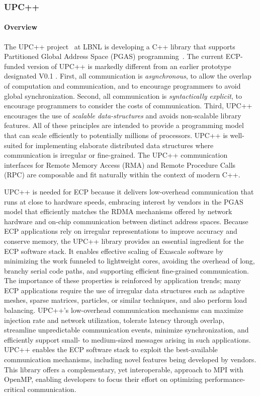 \subsubsection{ UPC++} 
\paragraph{Overview} 
The UPC++ project~\cite{upcxx-site} at LBNL is developing a C++ library
that supports Partitioned Global Address Space (PGAS) programming~\cite{Bachan:paw17,upcxx-spec}.
The current ECP-funded version of
UPC++ is markedly different from an earlier prototype designated V0.1 \cite{zheng:ipdps14}.  
First, all communication is \emph{asynchronous}, to allow the overlap of computation and
communication, and to encourage programmers to avoid global synchronization. Second, all communication
is \emph{syntactically explicit}, to encourage programmers to consider the costs of communication. Third,
UPC++ encourages the use of \emph{scalable data-structures}
and avoids non-scalable library features.
All of these principles are intended to provide a programming model that can
scale efficiently to potentially millions of processors.
UPC++ is well-suited for implementing elaborate distributed data structures where
communication is irregular or fine-grained. 
The UPC++ communication interfaces for Remote Memory Access (RMA) 
and Remote Procedure Calls (RPC)
are composable and fit naturally within the context of modern C++.

UPC++ is needed for ECP because it delivers low-overhead communication that runs
at close to hardware speeds, embracing 
interest by vendors in the PGAS model that
efficiently matches the RDMA mechanisms offered by
network hardware and on-chip communication between distinct address
spaces.  
Because ECP applications rely on irregular representations
to improve accuracy and conserve memory, the UPC++ library provides
an essential ingredient for the ECP software stack.  It enables
effective scaling of Exascale software by minimizing the work funneled
to lightweight cores, avoiding the overhead of long, branchy serial
code paths, and supporting efficient fine-grained communication.  The
importance of these properties is reinforced by application trends;
many ECP applications require the use of irregular data structures such as 
adaptive meshes, sparse
matrices, particles, or similar techniques, and also perform load balancing.  UPC++'s
low-overhead communication mechanisms can maximize injection rate and
network utilization, tolerate latency through overlap, streamline
unpredictable communication events, minimize synchronization, and
efficiently support small- to medium-sized messages arising in such
applications.  UPC++ enables the ECP software stack to exploit
the best-available communication mechanisms, including novel features
being developed by vendors.  This library offers a complementary,
yet interoperable, approach to MPI with OpenMP, enabling developers to
focus their effort on optimizing performance-critical communication.

